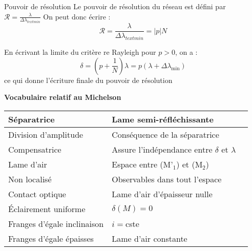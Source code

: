 \documentclass[french, a4paper, 11pt, twocolumn]{article}
\begin{document}
\begin{cadre}{Pouvoir de résolution}
    Le pouvoir de résolution du réseau est défini par \(\mathcal{R}=\frac{\lambda}{\Delta\lambda_{text{min}}}\)
    On peut donc écrire : 
        \[\mathcal{R}=\frac{\lambda}{\Delta\lambda_{text{min}}}=|p|N\]

    \tcblower
    En écrivant la limite du critère re Rayleigh pour \(p>0\), on a :
        \[\delta=(p+\frac{1}{N})\lambda=p(\lambda + \Delta\lambda_{\text{min}})\]
    ce qui donne l'écriture finale du pouvoir de résolution
\end{cadre}

\begin{center}
    \textbf{Vocabulaire relatif au Michelson}
    \begin{tabular}{|l|l|l}
        \hline Séparatrice & Lame semi-réfléchissante \\
        \hline Division d'amplitude & Conséquence de la séparatrice \\
        \hline Compensatrice & Assure l'indépendance entre \(\delta\) et \(\lambda\) \\
        \hline Lame d'air & Espace entre (M'\(_1\)) et (M\(_2\)) \\
        \hline Non localisé & Observables dans tout l'espace \\
        \hline Contact optique & Lame d'air d'épaisseur nulle \\
        \hline Éclairement uniforme & \(\delta(M)=0\) \\
        \hline Franges d'égale inclinaison& \(i=\)cste \\
        \hline Franges d'égale épaisses & Lame d'air constante \\
        \hline 
    \end{tabular}
\end{center}
\end{document}
